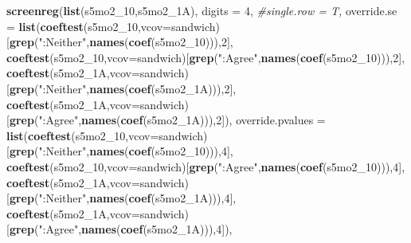 \documentclass[
]{article}
\newenvironment{Shaded}{\begin{snugshade}}{\end{snugshade}}
\newcommand{\CommentTok}[1]{\textcolor[rgb]{0.56,0.35,0.01}{\textit{#1}}}
\newcommand{\DataTypeTok}[1]{\textcolor[rgb]{0.13,0.29,0.53}{#1}}
\newcommand{\DecValTok}[1]{\textcolor[rgb]{0.00,0.00,0.81}{#1}}
\newcommand{\KeywordTok}[1]{\textcolor[rgb]{0.13,0.29,0.53}{\textbf{#1}}}
\newcommand{\NormalTok}[1]{#1}
\newcommand{\StringTok}[1]{\textcolor[rgb]{0.31,0.60,0.02}{#1}}
\begin{document}
\begin{Shaded}
\begin{Highlighting}[]
\KeywordTok{screenreg}\NormalTok{(}\KeywordTok{list}\NormalTok{(s5mo2_}\DecValTok{10}\NormalTok{,s5mo2_1A), }\DataTypeTok{digits =} \DecValTok{4}\NormalTok{, }\CommentTok{#single.row = T,}
          \DataTypeTok{override.se =} \KeywordTok{list}\NormalTok{(}\KeywordTok{coeftest}\NormalTok{(s5mo2_}\DecValTok{10}\NormalTok{,}\DataTypeTok{vcov=}\NormalTok{sandwich)[}\KeywordTok{grep}\NormalTok{(}\StringTok{":Neither"}\NormalTok{,}\KeywordTok{names}\NormalTok{(}\KeywordTok{coef}\NormalTok{(s5mo2_}\DecValTok{10}\NormalTok{))),}\DecValTok{2}\NormalTok{],}
                             \KeywordTok{coeftest}\NormalTok{(s5mo2_}\DecValTok{10}\NormalTok{,}\DataTypeTok{vcov=}\NormalTok{sandwich)[}\KeywordTok{grep}\NormalTok{(}\StringTok{":Agree"}\NormalTok{,}\KeywordTok{names}\NormalTok{(}\KeywordTok{coef}\NormalTok{(s5mo2_}\DecValTok{10}\NormalTok{))),}\DecValTok{2}\NormalTok{],}
                             \KeywordTok{coeftest}\NormalTok{(s5mo2_1A,}\DataTypeTok{vcov=}\NormalTok{sandwich)[}\KeywordTok{grep}\NormalTok{(}\StringTok{":Neither"}\NormalTok{,}\KeywordTok{names}\NormalTok{(}\KeywordTok{coef}\NormalTok{(s5mo2_1A))),}\DecValTok{2}\NormalTok{],}
                             \KeywordTok{coeftest}\NormalTok{(s5mo2_1A,}\DataTypeTok{vcov=}\NormalTok{sandwich)[}\KeywordTok{grep}\NormalTok{(}\StringTok{":Agree"}\NormalTok{,}\KeywordTok{names}\NormalTok{(}\KeywordTok{coef}\NormalTok{(s5mo2_1A))),}\DecValTok{2}\NormalTok{]),}
          \DataTypeTok{override.pvalues =} \KeywordTok{list}\NormalTok{(}\KeywordTok{coeftest}\NormalTok{(s5mo2_}\DecValTok{10}\NormalTok{,}\DataTypeTok{vcov=}\NormalTok{sandwich)[}\KeywordTok{grep}\NormalTok{(}\StringTok{":Neither"}\NormalTok{,}\KeywordTok{names}\NormalTok{(}\KeywordTok{coef}\NormalTok{(s5mo2_}\DecValTok{10}\NormalTok{))),}\DecValTok{4}\NormalTok{],}
                                  \KeywordTok{coeftest}\NormalTok{(s5mo2_}\DecValTok{10}\NormalTok{,}\DataTypeTok{vcov=}\NormalTok{sandwich)[}\KeywordTok{grep}\NormalTok{(}\StringTok{":Agree"}\NormalTok{,}\KeywordTok{names}\NormalTok{(}\KeywordTok{coef}\NormalTok{(s5mo2_}\DecValTok{10}\NormalTok{))),}\DecValTok{4}\NormalTok{],}
                                  \KeywordTok{coeftest}\NormalTok{(s5mo2_1A,}\DataTypeTok{vcov=}\NormalTok{sandwich)[}\KeywordTok{grep}\NormalTok{(}\StringTok{":Neither"}\NormalTok{,}\KeywordTok{names}\NormalTok{(}\KeywordTok{coef}\NormalTok{(s5mo2_1A))),}\DecValTok{4}\NormalTok{],}
                                  \KeywordTok{coeftest}\NormalTok{(s5mo2_1A,}\DataTypeTok{vcov=}\NormalTok{sandwich)[}\KeywordTok{grep}\NormalTok{(}\StringTok{":Agree"}\NormalTok{,}\KeywordTok{names}\NormalTok{(}\KeywordTok{coef}\NormalTok{(s5mo2_1A))),}\DecValTok{4}\NormalTok{]),}

\end{Highlighting}
\end{Shaded}
\end{document}
